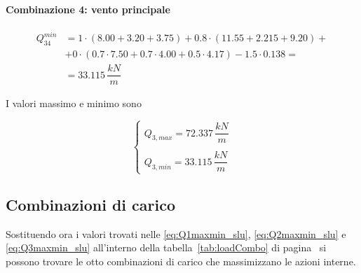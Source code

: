 \paragraph{Combinazione 4: vento principale}

\begin{align*}
	Q_{34}^{min} &= 1\cdot(8.00+3.20 + 3.75) + 0.8\cdot(11.55+2.215 + 9.20) +\\
	&+0\cdot(0.7 \cdot 7.50 + 0.7\cdot4.00+ 0.5\cdot4.17) - 1.5\cdot 0.138 =\\
	&=  33.115\,\dfrac{kN}{m}
\end{align*}

I valori massimo e minimo sono

\begin{equation}
		\label{eq:Q3maxmin_slu}
		\begin{cases}
			Q_{3,max} = 72.337\,\dfrac{kN}{m}\\\\
			Q_{3, min} = 33.115\,\dfrac{kN}{m}
		\end{cases}
\end{equation}

\subsection{Combinazioni di carico}\label{sec:loadCombo}
Sostituendo ora i valori trovati nelle \eqref{eq:Q1maxmin_slu}, \eqref{eq:Q2maxmin_slu} e \eqref{eq:Q3maxmin_slu} all'interno della tabella~\ref{tab:loadCombo} di pagina~\pageref{tab:loadCombo} si possono trovare le otto combinazioni di carico che massimizzano le azioni interne.

